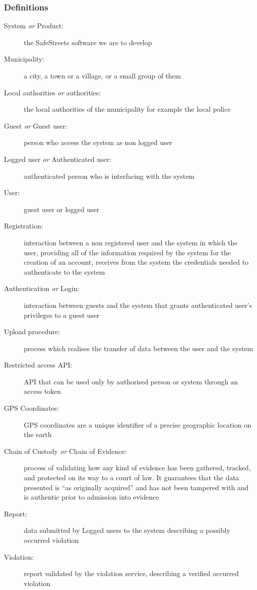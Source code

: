 	\subsubsection{Definitions}
	\begin{description}
		\item[System \emph{or} Product:]the SafeStreets software we are to develop
		\item[Municipality:] a city, a town or a village, or a small group of them
		\item[Local authorities \emph{or} authorities:] the local authorities of the municipality for example the local police
		\item[Guest \emph{or} Guest user:] person who access the system as non logged user
		\item[Logged user \emph{or} Authenticated user:] authenticated person who is interfacing with the system
		\item[User:] guest user or logged user
		\item[Registration:]  interaction between a non registered user and the system in which the user, providing all of the information required by the system for the creation of an account, receives from the system the credentials needed to authenticate to the system
		\item[Authentication \emph{or} Login:] interaction between guests and the system that grants authenticated user's privileges to a guest user
		\item[Upload procedure:] process which realises the transfer of data between the user and the system
		\item[Restricted access API:] API that can be used only by authorised person or system through an access token
		\item[GPS Coordinates:] GPS coordinates are a unique identifier of a precise geographic location on the earth
		\item[Chain of Custody \emph{or} Chain of Evidence:] process of validating how any kind of evidence has been gathered, tracked, and protected on its way to a court of law. It guarantees that the data presented is “as originally acquired” and has not been tampered with and is authentic prior to admission into evidence \cite{Stone}
		\item[Report:] data submitted by Logged users to the system describing a possibly occurred violation
		\item[Violation:] report validated by the violation service, describing a verified occurred violation
		
	\end{description}
